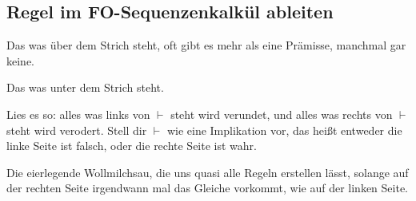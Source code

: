 \documentclass[
    ngerman,
    color=3b,
    summary,
    boxarc,
    main,
    fleqn,
    leqno,
]{rubos-tuda-template}
\begin{document}
    \subsection{Regel im FO-Sequenzenkalkül ableiten}
    \begin{definition}[Prämisse]
        Das was über dem Strich steht, oft gibt es mehr als eine Prämisse, manchmal gar keine.
    \end{definition}
    \begin{definition}[Konklusion]
        Das was unter dem Strich steht.
    \end{definition}
    \begin{definition}[$\vdash$]
        Lies es so: alles was links von $\vdash$ steht wird verundet, und alles was rechts von $\vdash$ steht wird verodert. Stell dir $\vdash$ wie eine Implikation vor, das heißt entweder die linke Seite ist falsch, oder die rechte Seite ist wahr.
    \end{definition}
    \begin{definition}[Regel (Ax)]
        Die eierlegende Wollmilchsau, die uns quasi alle Regeln erstellen lässt, solange auf der rechten Seite irgendwann mal das Gleiche vorkommt, wie auf der linken Seite.
    \end{definition}
\end{document}
